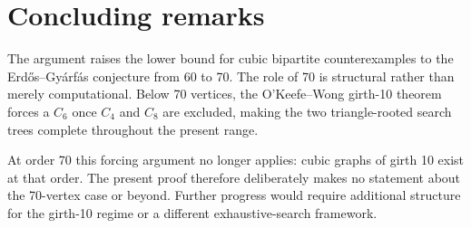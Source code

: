 \documentclass[11pt]{article}
\theoremstyle{remark}
\newcommand{\Cfour}{C_4}
\newcommand{\Csix}{C_6}
\newcommand{\Ceight}{C_8}
\begin{document}
\section{Concluding remarks}\label{sec:conclusion}

The argument raises the lower bound for cubic bipartite counterexamples to the Erd\H{o}s--Gy\'arf\'as conjecture from 60 to 70.  The role of 70 is structural rather than merely computational.  Below 70 vertices, the O'Keefe--Wong girth-10 theorem forces a \(\Csix\) once \(\Cfour\) and \(\Ceight\) are excluded, making the two triangle-rooted search trees complete throughout the present range.

At order 70 this forcing argument no longer applies: cubic graphs of girth 10 exist at that order.  The present proof therefore deliberately makes no statement about the 70-vertex case or beyond.  Further progress would require additional structure for the girth-10 regime or a different exhaustive-search framework.

\printbibliography
\end{document}
